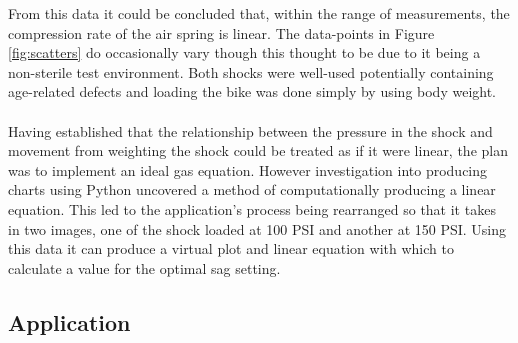 			From this data it could be concluded that, within the range of measurements, the compression rate of the air spring is linear. The data-points in Figure \ref{fig:scatters} do occasionally vary though this thought to be due to it being a non-sterile test environment. Both shocks were well-used potentially containing age-related defects and loading the bike was done simply by using body weight.
			\\\\
			Having established that the relationship between the pressure in the shock and movement from weighting the shock could be treated as if it were linear, the plan was to implement an ideal gas equation. However investigation into producing charts using Python uncovered a method of computationally producing a linear equation. This led to the application’s process being rearranged so that it takes in two images, one of the shock loaded at 100 PSI and another at 150 PSI. Using this data it can produce a virtual plot and linear equation with which to calculate a value for the optimal sag setting.
	\subsection{Application}
